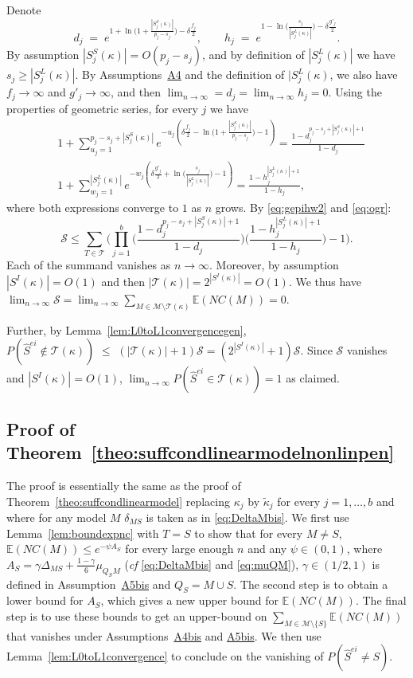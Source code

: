 \documentclass[
  12pt]{article}
\newcommand{\E}{\mathbb{E}}
\newcommand{\M}{\mathcal{M}}
\newcommand{\T}{\mathcal{T}}
\begin{document}
Denote
$$
d_j\;=\;e^{1+\ln\big(1+\frac{|S^{S}_j(\kappa)|}{p_j-s_j}\big)-\delta \tfrac{f_j}{2}},\qquad h_j\;=\;e^{1-\ln\big(\frac{s_j}{|S_j^{L}(\kappa)|}\big)-\delta \tfrac{g'_j}{2}}.
$$
By assumption $|S^{S}_j(\kappa)|=O(p_j-s_j)$, and by definition of $|S_j^{L}(\kappa)|$ we have $s_j\geq|S_j^{L}(\kappa)|$. By Assumptions~\hyperlink{lab:A4}{A4} and the definition of $|S_j^{L}(\kappa)$, we also have $f_j\to\infty$ and $g'_j\to\infty$, and then $\lim_{n \to \infty}= d_j= \lim_{n \to \infty} h_j=0$. Using the properties of geometric series, 
 for every $j$ we have
\begin{eqnarray*}
    &1+\sum_{u_j=1}^{p_j-s_j+|S_j^{S}(\kappa)|}e^{-u_j\left(\delta \tfrac{f_j}{2}-\ln\big(1+\frac{|S^{S}_j(\kappa)|}{p_j-s_j}\big)-1\right)}
    =\frac{1-d_j^{p_j-s_j+|S_j^{S}(\kappa)|+1}}{1-d_j} \\
    &1+\sum_{w_j=1}^{|S_j^{L}(\kappa)|}    e^{-w_j\left(\delta \tfrac{g'_j}{2}+\ln\big(\frac{s_j}{|S_j^{L}(\kappa)|}\big)-1\right)} =\frac{1-h_j^{|S_j^{L}(\kappa)|+1}}{1-h_j},
\end{eqnarray*}
where both expressions converge to $1$ as $n$ grows. By \eqref{eq:gepihw2} and \eqref{eq:ogr}:
$$\mathcal{S}\leq\sum_{T\in\T}\Bigg(\prod_{j=1}^b\Big(\frac{1-d_j^{p_j-s_j+|S_j^{S}(\kappa)|+1}}{1-d_j}\Big)\Big(\frac{1-h_j^{|S_j^{L}(\kappa)|+1}}{1-h_j}\Big)-1\Bigg).$$
Each of the summand vanishes as $n\to\infty$. Moreover, by assumption $|S^I(\kappa)|=O(1)$ and then $|\T(\kappa)|=2^{|S^I(\kappa)|}=O(1)$. We thus have $\lim_{n\to\infty}\mathcal{S}=\lim_{n\to\infty}\sum_{M \in \M\setminus \T(\kappa)} \E\left(NC(M)\right)=0$.

Further, by Lemma~\ref{lem:L0toL1convergencegen}, 
$P(\hat{S}^{ei} \not\in \T(\kappa) ) \,\,\leq \,\, (|\T(\kappa)|+1) \mathcal{S} = (2^{|S^{I}(\kappa)|}+1) \mathcal{S}$. Since $\mathcal{S}$ vanishes and $|S^{I}(\kappa)|=O(1)$, $\lim_{n\to\infty}P(\hat{S}^{ei} \in \T(\kappa) )=1$ as claimed.

\subsection{Proof of Theorem~\ref{theo:suffcondlinearmodelnonlinpen}}
The proof is essentially the same as the proof of Theorem~\ref{theo:suffcondlinearmodel} replacing $\kappa_j$ by $\tilde{\kappa}_{j}$ for every $j=1,\ldots,b$ and where for any model $M$ $\delta_{MS}$ is taken as in \eqref{eq:DeltaMbis}. We first use Lemma~\ref{lem:boundexpnc} with $T = S$ to show that for every $M\neq S$, $\E(NC(M)) \leq e^{-\psi A_S}$ for every large enough $n$ and any $\psi \in (0,1)$, where $A_S=\gamma\Delta_{MS}+\tfrac{1-\gamma}{6}\mu_{Q_SM}$ (\emph{cf} \eqref{eq:DeltaMbis} and \eqref{eq:muQM}), $\gamma\in(1/2,1)$ is defined in Assumption~\hyperlink{lab:A5bis}{A5bis} and $Q_S= M\cup S$.
The second step is to obtain a lower bound for $A_S$, which gives a new upper bound for $\E(NC(M))$.
The final step is to use these bounds to get an upper-bound on $\sum_{M \in \M\setminus \{S\}} \E\left(NC(M)\right)$ that vanishes under Assumptions~\hyperlink{lab:A4bis}{A4bis} and \hyperlink{lab:A5bis}{A5bis}. We then use Lemma~\ref{lem:L0toL1convergence} to conclude on the vanishing of $P(\hat{S}^{ei} \neq S)$. 
\end{document}
